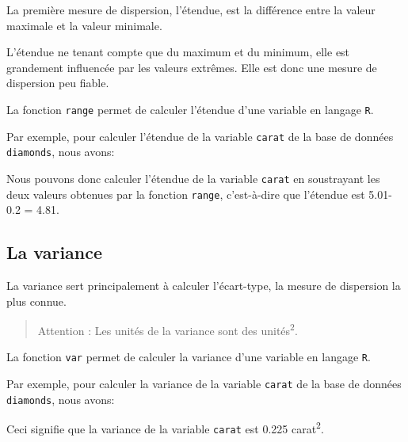 \documentclass[]{book}
\newenvironment{Shaded}{\begin{snugshade}}{\end{snugshade}}
\newcommand{\KeywordTok}[1]{\textcolor[rgb]{0.13,0.29,0.53}{\textbf{#1}}}
\newcommand{\NormalTok}[1]{#1}
\newcommand{\OperatorTok}[1]{\textcolor[rgb]{0.81,0.36,0.00}{\textbf{#1}}}
\theoremstyle{definition}
\theoremstyle{definition}
\theoremstyle{definition}
\theoremstyle{remark}
\begin{document}
La première mesure de dispersion, l'étendue, est la différence entre la
valeur maximale et la valeur minimale.

L'étendue ne tenant compte que du maximum et du minimum, elle est
grandement influencée par les valeurs extrêmes. Elle est donc une mesure
de dispersion peu fiable.

La fonction \texttt{range} permet de calculer l'étendue d'une variable
en langage \texttt{R}.

Par exemple, pour calculer l'étendue de la variable \texttt{carat} de la
base de données \texttt{diamonds}, nous avons:

\begin{Shaded}
\end{Shaded}

Nous pouvons donc calculer l'étendue de la variable \texttt{carat} en
soustrayant les deux valeurs obtenues par la fonction \texttt{range},
c'est-à-dire que l'étendue est 5.01-0.2 = 4.81.

\hypertarget{la-variance}{%
\subsection{La variance}\label{la-variance}}

La variance sert principalement à calculer l'écart-type, la mesure de
dispersion la plus connue.

\begin{quote}
Attention : Les unités de la variance sont des
unités\textsuperscript{2}.
\end{quote}

La fonction \texttt{var} permet de calculer la variance d'une variable
en langage \texttt{R}.

Par exemple, pour calculer la variance de la variable \texttt{carat} de
la base de données \texttt{diamonds}, nous avons:

\begin{Shaded}
\end{Shaded}

Ceci signifie que la variance de la variable \texttt{carat} est 0.225
carat\textsuperscript{2}.
\end{document}
